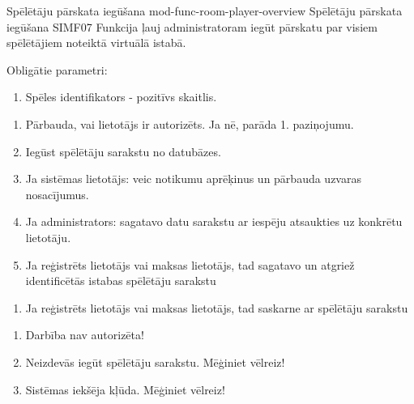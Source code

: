 \moduleFunctionTable
{Spēlētāju pārskata iegūšana}
{mod-func-room-player-overview}
{Spēlētāju pārskata iegūšana}
{SIMF07}
{
	Funkcija ļauj administratoram iegūt pārskatu par visiem spēlētājiem noteiktā virtuālā istabā.
}
{
	Obligātie parametri:
	\begin{enumerate}
		\item Spēles identifikators - pozitīvs skaitlis.
	\end{enumerate}
}
{
	\begin{enumerate}
		\item Pārbauda, vai lietotājs ir autorizēts. Ja nē, parāda 1. paziņojumu.
		\item Iegūst spēlētāju sarakstu no datubāzes.
		\item Ja sistēmas lietotājs: veic notikumu aprēķinus un pārbauda uzvaras nosacījumus.
		\item Ja administrators: sagatavo datu sarakstu ar iespēju atsaukties uz konkrētu lietotāju.
		\item Ja reģistrēts lietotājs vai maksas lietotājs, tad sagatavo un atgriež identificētās istabas spēlētāju sarakstu
	\end{enumerate}
}
{
	\begin{enumerate}
		\item Ja reģistrēts lietotājs vai maksas lietotājs, tad saskarne ar spēlētāju sarakstu
	\end{enumerate}
}
{
	\begin{enumerate}
		\item Darbība nav autorizēta!
		\item Neizdevās iegūt spēlētāju sarakstu. Mēģiniet vēlreiz!
		\item Sistēmas iekšēja kļūda. Mēģiniet vēlreiz!
	\end{enumerate}
}
